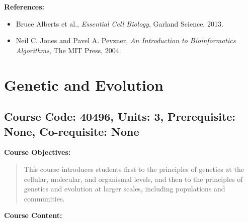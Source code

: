\documentclass[12pt]{article}
\begin{document}
\textbf{References:}
\begin{itemize}
    \item Bruce Alberts et al., \textit{Essential Cell Biology}, Garland Science, 2013.
    \item Neil C. Jones and Pavel A. Pevzner, \textit{An Introduction to Bioinformatics Algorithms}, The MIT Press, 2004.
\end{itemize}

\newpage

\section{Genetic and Evolution}
\subsection*{Course Code: 40496, Units: 3, Prerequisite: None, Co-requisite: None}

\textbf{Course Objectives:}  
\begin{quote}
   This course introduces students first to the principles of genetics at the cellular, molecular, and organismal levels, and then to the principles of genetics and evolution at larger scales, including populations and communities.
\end{quote}

\textbf{Course Content:}
\end{document}
